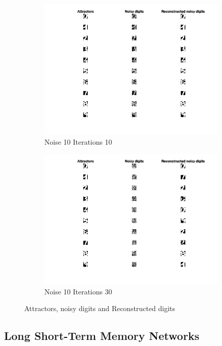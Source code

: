 \documentclass[11pt,conference,compsoc]{IEEEtran}
\begin{document}
\begin{figure}[]
\begin{subfigure}{0.32\linewidth}
        \includegraphics[width=\linewidth]{images/noise1_iter10.png}
        \caption{Noise 10 Iterations 10}
    \end{subfigure}
    \begin{subfigure}{0.32\linewidth}
        \includegraphics[width=\linewidth]{images/noise10_iter30.png}
        \caption{Noise 10 Iterations 30}
    \end{subfigure}
    
    \caption{Attractors, noisy digits and Reconstructed digits}
    \label{fig:7}    
    
\end{figure}

\subsection{Long Short-Term Memory Networks}
\end{document}
